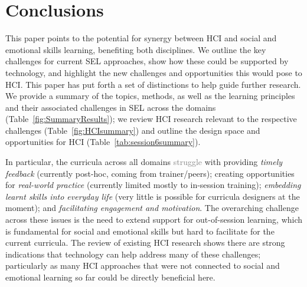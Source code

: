 \documentclass[prodmode,acmtochi]{acmsmall}
\newcommand{\todo}[1]{\textrm{\textrm{\textcolor{LightBlue}{[[#1]]}}}}
\newcommand{\rephrase}[1]{\textrm{\textrm{\textcolor{gray}{#1}}}}
\begin{document}


\fi



\section{Conclusions}
\label{sec:conclusion}

This paper points to the potential for synergy between HCI and social and emotional skills learning, benefiting both disciplines.
%
We outline the key challenges for current SEL approaches, show how these could be supported by technology, and highlight the new challenges and opportunities this would pose to HCI. 
%
This paper has put forth a set of distinctions to help guide further research. We provide a summary of the topics, methods, as well as the learning principles and their associated challenges in SEL across the domains (Table~\ref{fig:SummaryResults}); we review HCI research relevant to the respective challenges (Table~\ref{fig:HCIsummary}) and outline the design space and opportunities for HCI (Table~\ref{tab:session6summary}). 

In particular, the curricula across all domains \rephrase{struggle} with providing \emph{timely feedback} (currently post-hoc, coming from trainer/peers); creating opportunities for \emph{real-world practice} (currently limited mostly to in-session training); \emph{embedding learnt skills into everyday life} (very little is possible for curricula designers at the moment); and \emph{facilitating engagement and motivation}. The overarching challenge across these issues is the need to extend support for out-of-session learning, which is fundamental for social and emotional skills  but hard to facilitate for the current curricula.
%
The review of existing HCI research shows there are strong indications that technology can help address many of these challenges; particularly as many HCI approaches that were not connected to social and emotional learning so far could be directly beneficial here.
\end{document}
